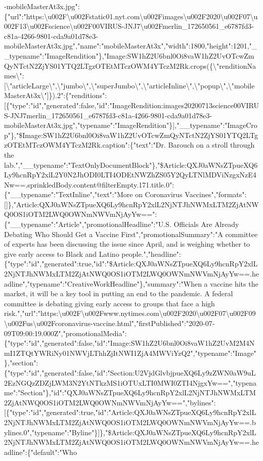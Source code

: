 -mobileMasterAt3x.jpg":\{"url":"https:\textbackslash{}u002F\textbackslash{}u002Fstatic01.nyt.com\textbackslash{}u002Fimages\textbackslash{}u002F2020\textbackslash{}u002F07\textbackslash{}u002F13\textbackslash{}u002Fscience\textbackslash{}u002F00VIRUS-JNJ7\textbackslash{}u002Fmerlin\_172650561\_e6787fd3-c81a-4266-9801-cda9a01d78e3-mobileMasterAt3x.jpg","name":"mobileMasterAt3x","width":1800,"height":1201,"\_\_typename":"ImageRendition"\},"Image:SW1hZ2U6bnl0Oi8vaW1hZ2UvOTcwZmQyNTctN2ZjYS01YTQ2LTgzOTEtMTczOWM4YTczM2Rk.crops(\{\textbackslash{}"renditionNames\textbackslash{}":{[}\textbackslash{}"articleLarge\textbackslash{}",\textbackslash{}"jumbo\textbackslash{}",\textbackslash{}"superJumbo\textbackslash{}",\textbackslash{}"articleInline\textbackslash{}",\textbackslash{}"popup\textbackslash{}",\textbackslash{}"mobileMasterAt3x\textbackslash{}"{]}\}).2":\{"renditions":{[}\{"type":"id","generated":false,"id":"ImageRendition:images20200713science00VIRUS-JNJ7merlin\_172650561\_e6787fd3-c81a-4266-9801-cda9a01d78e3-mobileMasterAt3x.jpg","typename":"ImageRendition"\}{]},"\_\_typename":"ImageCrop"\},"\$Image:SW1hZ2U6bnl0Oi8vaW1hZ2UvOTcwZmQyNTctN2ZjYS01YTQ2LTgzOTEtMTczOWM4YTczM2Rk.caption":\{"text":"Dr.
Barouch on a stroll through the
lab.","\_\_typename":"TextOnlyDocumentBlock"\},"\$Article:QXJ0aWNsZTpueXQ6Ly9hcnRpY2xlL2Y0N2JhODI0LTI4ODEtNWZhZS05Y2QyLTNlMDViNzgxNzE4Nw==.sprinkledBody.content@filterEmpty.171.title.0":\{"\_\_typename":"TextInline","text":"More
on Coronavirus
Vaccines","formats":{[}{]}\},"Article:QXJ0aWNsZTpueXQ6Ly9hcnRpY2xlL2NjNTJhNWMxLTM2ZjAtNWQ0OS1iOTM2LWQ0OWNmNWVmNjAyYw==":\{"\_\_typename":"Article","promotionalHeadline":"U.S.
Officials Are Already Debating Who Should Get a Vaccine
First","promotionalSummary":"A committee of experts has been discussing
the issue since April, and is weighing whether to give early access to
Black and Latino
people.","headline":\{"type":"id","generated":true,"id":"\$Article:QXJ0aWNsZTpueXQ6Ly9hcnRpY2xlL2NjNTJhNWMxLTM2ZjAtNWQ0OS1iOTM2LWQ0OWNmNWVmNjAyYw==.headline","typename":"CreativeWorkHeadline"\},"summary":"When
a vaccine hits the market, it will be a key tool in putting an end to
the pandemic. A federal committee is debating giving early access to
groups that face a high
risk.","url":"https:\textbackslash{}u002F\textbackslash{}u002Fwww.nytimes.com\textbackslash{}u002F2020\textbackslash{}u002F07\textbackslash{}u002F09\textbackslash{}u002Fus\textbackslash{}u002Fcoronavirus-vaccine.html","firstPublished":"2020-07-09T09:00:19.000Z","promotionalMedia":\{"type":"id","generated":false,"id":"Image:SW1hZ2U6bnl0Oi8vaW1hZ2UvM2M4NmI1ZTQtYWRiNy01NWVjLThhZjItNWI1ZjA4MWViYzQ2","typename":"Image"\},"section":\{"type":"id","generated":false,"id":"Section:U2VjdGlvbjpueXQ6Ly9zZWN0aW9uL2EzNGQzZDZjLWM3N2YtNTkzMS1iOTUxLTI0MWI0ZTI4NjgxYw==","typename":"Section"\},"id":"QXJ0aWNsZTpueXQ6Ly9hcnRpY2xlL2NjNTJhNWMxLTM2ZjAtNWQ0OS1iOTM2LWQ0OWNmNWVmNjAyYw==","bylines":{[}\{"type":"id","generated":true,"id":"Article:QXJ0aWNsZTpueXQ6Ly9hcnRpY2xlL2NjNTJhNWMxLTM2ZjAtNWQ0OS1iOTM2LWQ0OWNmNWVmNjAyYw==.bylines.0","typename":"Byline"\}{]}\},"\$Article:QXJ0aWNsZTpueXQ6Ly9hcnRpY2xlL2NjNTJhNWMxLTM2ZjAtNWQ0OS1iOTM2LWQ0OWNmNWVmNjAyYw==.headline":\{"default":"Who
